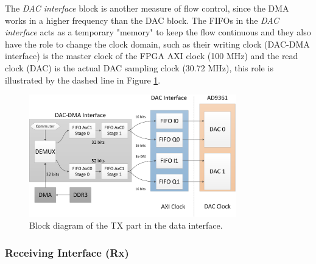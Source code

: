 The \emph{DAC interface} block is another measure of flow control, since the DMA
works in a higher frequency than the DAC block. The FIFOs in the \emph{DAC
interface} acts as a temporary "memory" to keep the flow continuous and they
also have the role to change the clock domain, such as their writing clock
(DAC-DMA interface) is the master clock of the FPGA AXI clock (100 MHz) and the
read clock (DAC) is the actual DAC sampling clock (30.72 MHz), this role is
illustrated by the dashed line in Figure \ref{fig:dataiftx}.
%

\begin{figure}[htbp]
    \centering
    \includegraphics[width=0.80\textwidth]{./figures/txdata_if}
    \caption{ Block diagram of the TX part in the data interface.
    \label{fig:dataiftx}}
\end{figure}

\subsubsection{Receiving Interface (Rx)} %

